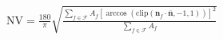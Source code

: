$\mathrm{NV}=
    \frac{180}{\pi}
    \sqrt{
    \frac{
    \sum_{f\in\mathcal{F}} A_f
    \left[
    \arccos\left(\mathrm{clip}(\mathbf{n}_f\cdot\bar{\mathbf{n}},-1,1)\right)
    \right]^2
    }{
    \sum_{f\in\mathcal{F}} A_f
    }
    }$
